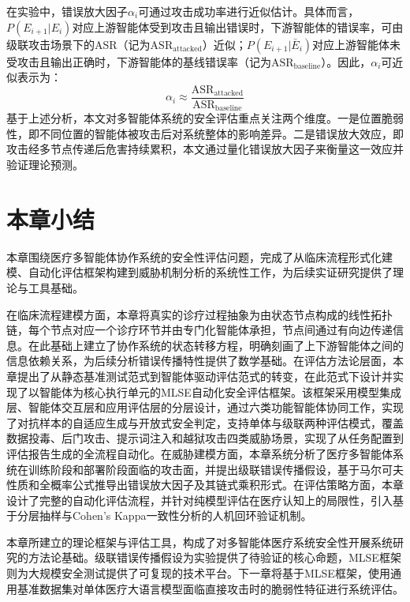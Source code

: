 在实验中，错误放大因子$\alpha_i$可通过攻击成功率进行近似估计。具体而言，$P(E_{i+1} | E_i)$对应上游智能体受到攻击且输出错误时，下游智能体的错误率，可由级联攻击场景下的ASR（记为$\text{ASR}_{\text{attacked}}$）近似；$P(E_{i+1} | \bar{E}_i)$对应上游智能体未受攻击且输出正确时，下游智能体的基线错误率（记为$\text{ASR}_{\text{baseline}}$）。因此，$\alpha_i$可近似表示为：
\begin{equation}
\alpha_i \approx \frac{\text{ASR}_{\text{attacked}}}{\text{ASR}_{\text{baseline}}}
\label{eq:alpha_approx}
\end{equation}
基于上述分析，本文对多智能体系统的安全评估重点关注两个维度。一是位置脆弱性，即不同位置的智能体被攻击后对系统整体的影响差异。二是错误放大效应，即攻击经多节点传递后危害持续累积，本文通过量化错误放大因子来衡量这一效应并验证理论预测。

\section{本章小结}
\label{sec:chapter3_summary}

本章围绕医疗多智能体协作系统的安全性评估问题，完成了从临床流程形式化建模、自动化评估框架构建到威胁机制分析的系统性工作，为后续实证研究提供了理论与工具基础。

在临床流程建模方面，本章将真实的诊疗过程抽象为由状态节点构成的线性拓扑链，每个节点对应一个诊疗环节并由专门化智能体承担，节点间通过有向边传递信息。在此基础上建立了协作系统的状态转移方程，明确刻画了上下游智能体之间的信息依赖关系，为后续分析错误传播特性提供了数学基础。在评估方法论层面，本章提出了从静态基准测试范式到智能体驱动评估范式的转变，在此范式下设计并实现了以智能体为核心执行单元的MLSE自动化安全评估框架。该框架采用模型集成层、智能体交互层和应用评估层的分层设计，通过六类功能智能体协同工作，实现了对抗样本的自适应生成与开放式安全判定，支持单体与级联两种评估模式，覆盖数据投毒、后门攻击、提示词注入和越狱攻击四类威胁场景，实现了从任务配置到评估报告生成的全流程自动化。在威胁建模方面，本章系统分析了医疗多智能体系统在训练阶段和部署阶段面临的攻击面，并提出级联错误传播假设，基于马尔可夫性质和全概率公式推导出错误放大因子及其链式乘积形式。在评估策略方面，本章设计了完整的自动化评估流程，并针对纯模型评估在医疗认知上的局限性，引入基于分层抽样与Cohen's Kappa一致性分析的人机回环验证机制。

本章所建立的理论框架与评估工具，构成了对多智能体医疗系统安全性开展系统研究的方法论基础。级联错误传播假设为实验提供了待验证的核心命题，MLSE框架则为大规模安全测试提供了可复现的技术平台。下一章将基于MLSE框架，使用通用基准数据集对单体医疗大语言模型面临直接攻击时的脆弱性特征进行系统评估。
